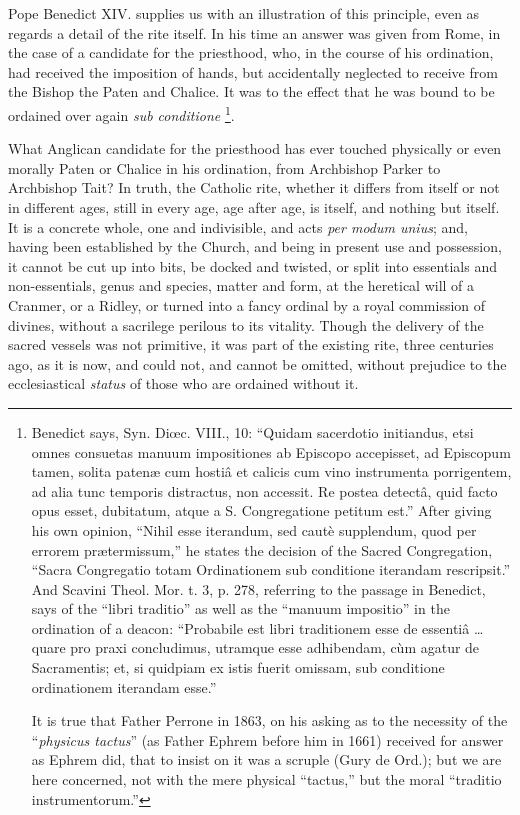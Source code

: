 Pope Benedict XIV. supplies us with an illustration of this principle,
even as regards a detail of the rite itself. In his time an answer was
given from Rome, in the case of a candidate for the priesthood,
who, in the course of his ordination, had received the imposition of
hands, but accidentally neglected to receive from the Bishop the Paten
and Chalice. It was to the effect that he was bound to be ordained
over again \emph{sub conditione} \footnote{Benedict says,
Syn. Diœc. VIII., 10: ``Quidam sacerdotio initiandus, etsi omnes
consuetas manuum impositiones ab Episcopo accepisset, ad Episcopum
tamen, solita patenæ cum hostiâ et calicis cum vino instrumenta
porrigentem, ad alia tunc temporis distractus, non accessit. Re postea
detectâ, quid facto opus esset, dubitatum, atque a S. Congregatione
petitum est.'' After giving his own opinion, ``Nihil esse
iterandum, sed cautè supplendum, quod per errorem prætermissum,''
he states the decision of the Sacred Congregation, ``Sacra
Congregatio totam Ordinationem sub conditione iterandam rescripsit.''
And Scavini Theol. Mor. t. 3, p. 278, referring to the passage in
Benedict, says of the ``libri traditio'' as well as the ``manuum
impositio'' in the ordination of a deacon: ``Probabile est
libri traditionem esse de essentiâ … quare pro praxi concludimus,
utramque esse adhibendam, cùm agatur de Sacramentis; et, si quidpiam
ex istis fuerit omissam, sub conditione ordinationem iterandam esse.''

It is true that Father Perrone in 1863, on his asking as to the
necessity of the ``\emph{physicus tactus}'' (as Father Ephrem before
him in 1661) received for answer as Ephrem did, that to insist on it
was a scruple (Gury de Ord.); but we are here concerned, not with the
mere physical ``tactus,'' but the moral ``traditio
instrumentorum.''}.

What Anglican candidate for the priesthood has ever touched
physically or even morally Paten or Chalice in his ordination, from
Archbishop Parker to Archbishop Tait? In truth, the Catholic rite,
whether it differs from itself or not in different ages, still in
every age, age after age, is itself, and nothing but itself. It is a
concrete whole, one and indivisible, and acts \emph{per modum unius};
and, having been established by the Church, and being in present use
and possession, it cannot be cut up into bits, be docked and twisted,
or split into essentials and non-essentials, genus and species,
matter and form, at the heretical will of a Cranmer, or a Ridley, or
turned into a fancy ordinal by a royal commission of divines, without
a sacrilege perilous to its vitality. Though the delivery of the
sacred vessels was not primitive, it was part of the existing rite,
three centuries ago, as it is now, and could not, and cannot be
omitted, without prejudice to the ecclesiastical \emph{status} of those who
are ordained without it.

